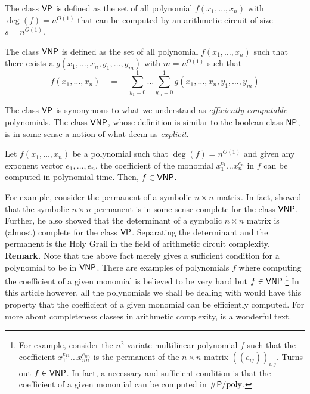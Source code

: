\begin{definition}
The class $\mathsf{VP}$ is defined as the set of all polynomial $f(x_1,\dots, x_n)$ with $\deg(f) = n^{O(1)}$ that can be computed by an arithmetic circuit of size $s = n^{O(1)}$. 

The class $\mathsf{VNP}$ is defined as the set of all polynomial $f(x_1,\dots, x_n)$ such that there exists a $g(x_1,\dots, x_n, y_1,\dots, y_m)$ with $m = n^{O(1)}$ such that
\[
f(x_1,\dots, x_n) \quad = \quad \sum_{y_1=0}^1\dots \sum_{y_m=0}^1 g(x_1,\dots, x_n, y_1,\dots, y_m)
\]
\end{definition}
The class $\mathsf{VP}$ is synonymous to what we understand as \emph{efficiently computable} polynomials. The class $\mathsf{VNP}$, whose definition is similar to the boolean class $\mathsf{NP}$, is in some sense a notion of what deem as \emph{explicit}. 

\begin{fact}
Let $f(x_1,\dots, x_n)$ be a polynomial such that $\deg(f) = n^{O(1)}$ and given any exponent vector $e_1,\dots, e_n$, the coefficient of the monomial $x_1^{e_1}\dots x_n^{e_n}$ in $f$ can be computed in polynomial time. Then, $f \in \mathsf{VNP}$. 
\end{fact}

For example, consider the permanent of a symbolic $n\times n$ matrix. In fact, \cite{v79} showed that the symbolic $n\times n$ permanent is in some sense complete for the class $\mathsf{VNP}$. Further, he also showed that the determinant of a symbolic  $n\times n$ matrix is (almost) complete for the class $\mathsf{VP}$. Separating the determinant and the permanent is the Holy Grail in the field of arithmetic circuit complexity. \\

{\bf Remark.} Note that the above fact merely gives a sufficient condition for a polynomial to be in $\mathsf{VNP}$. There are examples of polynomials $f$ where computing the coefficient of a given monomial is believed to be very hard but $f\in \mathsf{VNP}$.\footnote{For example, consider the $n^2$ variate multilinear polynomial $f$ such that the coefficient $x_{11}^{e_{11}}\dots x_{nn}^{e_{nn}}$ is the permanent of the $n\times n$ matrix $(\!(e_{ij})\!)_{i,j}$. Turns out $f \in \mathsf{VNP}$. In fact, a necessary and sufficient condition is that the coefficient of a given monomial can be computed in $\#\mathsf{P}/\mathrm{poly}$. }  In this article however, all the polynomials we shall be dealing with would have this property that the coefficient of a given monomial can be efficiently computed. For more about completeness classes in arithmetic complexity, \cite{bcs97} is a wonderful text. 



